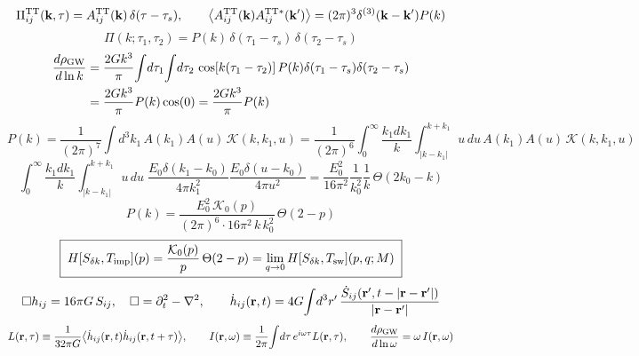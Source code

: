 \documentclass[10pt,prd,aps,nobibnotes,superscriptaddress,preprintnumbers,notitlepage]{revtex4-1}
\def \pa{\partial}
\newcommand{\br}{{\bf r}}
\newcommand{\kb}{{\bf k}}
\begin{document}
\begin{equation}
  \Pi^{\rm TT}_{ij}(\kb,\tau)=A^{\rm TT}_{ij}(\kb)\,\delta(\tau-\tau_s),
  \qquad
  \bigl\langle A^{\rm TT}_{ij}(\kb)A^{{\rm TT}*}_{ij}(\kb')\bigr\rangle
  =(2\pi)^3\delta^{(3)}(\kb-\kb')P(k)
  \label{A:impstress}
\end{equation}
\begin{equation}
  \Pi(k;\tau_1,\tau_2)=P(k)\,\delta(\tau_1-\tau_s)\,\delta(\tau_2-\tau_s)
  \label{A:impuetc}
\end{equation}
\begin{align}
  \frac{d\rho_{\rm GW}}{d\ln k}
  &=\frac{2Gk^3}{\pi}\!\int\!d\tau_1\!\int\!d\tau_2\,\cos[k(\tau_1-\tau_2)]\,
    P(k)\delta(\tau_1-\tau_s)\delta(\tau_2-\tau_s)
  \nonumber\\
  &=\frac{2Gk^3}{\pi}P(k)\cos(0)=\frac{2Gk^3}{\pi}P(k)
  \label{A:imptemporal}
\end{align}
\begin{equation}
  P(k)=\frac{1}{(2\pi)^7}\!\int\!d^3k_1\,A(k_1)A(u)\,\mathcal{K}(k,k_1,u)
  =\frac{1}{(2\pi)^6}\!\int_0^{\infty}\!\frac{k_1dk_1}{k}\!\int_{|k-k_1|}^{k+k_1}\!\!u\,du\,
  A(k_1)A(u)\,\mathcal{K}(k,k_1,u)
  \label{A:Pk}
\end{equation}
\begin{equation}
  \int_0^{\infty}\!\frac{k_1dk_1}{k}\!\int_{|k-k_1|}^{k+k_1}\!\!u\,du\;
  \frac{E_0\delta(k_1-k_0)}{4\pi k_1^2}\frac{E_0\delta(u-k_0)}{4\pi u^2}
  =\frac{E_0^2}{16\pi^2}\frac{1}{k_0^2}\frac{1}{k}\,\Theta(2k_0-k)
  \label{A:angcollapse}
\end{equation}
\begin{equation}
  P(k)=\frac{E_0^2\,\mathcal{K}_0(p)}{(2\pi)^6\cdot16\pi^2\,k\,k_0^2}\,\Theta(2-p)
  \label{A:Pkresult}
\end{equation}
\begin{equation}
  \boxed{\;
  H[S_{\delta k},T_{\rm imp}](p)=\frac{\mathcal{K}_0(p)}{p}\,\Theta(2-p)
  =\lim_{q\to0}H[S_{\delta k},T_{\rm sw}](p,q;M)\;}
  \label{A:Himp}
\end{equation}
\begin{equation}
  \Box h_{ij}=16\pi G\,S_{ij},
  \quad \Box=\pa_t^2-\nabla^2,
  \qquad
  \dot h_{ij}(\br,t)=4G\!\int\!d^3r'\,\frac{\dot S_{ij}(\br',t-|\br-\br'|)}{|\br-\br'|}
  \label{A:rshdot}
\end{equation}
\begin{equation}
  L(\br,\tau)\equiv\frac{1}{32\pi G}\bigl\langle\dot h_{ij}(\br,t)\dot h_{ij}(\br,t+\tau)\bigr\rangle,
  \qquad
  I(\br,\omega)\equiv\frac{1}{2\pi}\!\int\!d\tau\,e^{i\omega\tau}L(\br,\tau),
  \qquad
  \frac{d\rho_{\rm GW}}{d\ln\omega}=\omega\,I(\br,\omega)
  \label{A:rsLI}
\end{equation}
\end{document}
